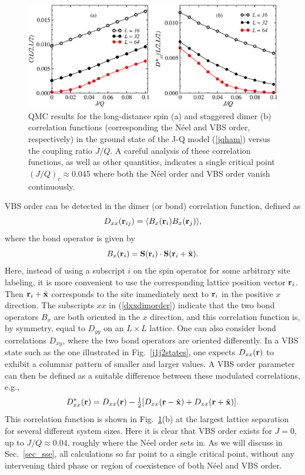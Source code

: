 \documentclass[draft,numberedheadings]{aipproc}
\newcommand{\half}{\hbox{$\frac{1}{2}$}}
\begin{document}
\begin{figure}
\includegraphics[width=12.5cm, clip]{jqmagdim.eps}
\caption{QMC results for the long-distance spin (a) and staggered dimer (b) correlation functions (corresponding the N\'eel and VBS order,
respectively) in the ground state of the J-Q model (\ref{jqham}) versus the coupling ratio $J/Q$. A careful analysis of these correlation functions, as well 
as other quantities, indicates a single critical point $(J/Q)_c\approx 0.045$ where both the N\'eel 
order and VBS order vanish continuously.} 
\label{jqmagdim}
\end{figure}

VBS order can be detected in the dimer (or bond) correlation function, defined as
\begin{equation}
D_{xx}({\bf r}_{ij}) = \langle B_x({\bf r}_i)B_x({\bf r}_j)\rangle,
\label{dxxdimorder}
\end{equation}
where the bond operator is given by
\begin{equation}
B_x({\bf r}_i) = {\bf S}({\bf r}_i) \cdot {\bf S}({\bf r}_i+\hat {\bf x}).
\label{bxxdef}
\end{equation}
Here, instead of using a subscript $i$ on the spin operator for some arbitrary site labeling, it is more convenient to use the corresponding lattice position
vector ${\bf r}_i$. Then ${\bf r}_i+\hat {\bf x}$ corresponds to the site immediately next to ${\bf r}_i$ in the positive $x$ direction. The subscripts $xx$ 
in (\ref{dxxdimorder}) indicate that the two bond operators $B_x$ are both oriented in the $x$ direction, and this correlation function is, by symmetry, 
equal to $D_{yy}$ on an $L\times L$ lattice. One can also consider bond correlations $D_{xy}$, where the two bond operators are oriented differently. In a VBS 
state such as the one illustrated in Fig.~\ref{j1j2states}, one expects $D_{xx}({\bf r})$ to exhibit a columnar pattern of smaller and larger values. A VBS order 
parameter can then be defined as a suitable difference between these modulated correlations, e.g.,
\begin{equation}
D^*_{xx}({\bf r}) = D_{xx}({\bf r}) - \half [D_{xx}({\bf r}-\hat {\bf x})  + D_{xx}({\bf r}+\hat {\bf x})]. 
\end{equation}
This correlation function is shown in Fig.~\ref{jqmagdim}(b) at the largest lattice separation for several different system sizes. 
Here it is clear that VBS order exists for $J=0$, up to $J/Q \approx 0.04$, roughly where the N\'eel order sets in. As we will discuss in 
Sec.~\ref{sec_sse}, all calculations so far point to a single critical point, without any intervening third phase or region of coexistence of 
both N\'eel and VBS order. 
\end{document}
